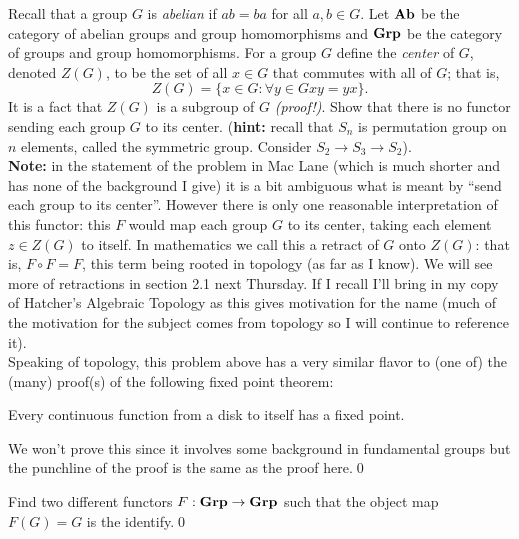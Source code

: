 \begin{problem} Recall that a group \(G\) is \textit{abelian} if \(ab = ba\) for
  all \(a,b \in G\). Let \(\mathbf{{Ab}}\) be the category of abelian groups and group
  homomorphisms and \(\mathbf{{Grp}}\) be the category of groups and group
  homomorphisms.
  For a group \(G\) define the \textit{center} of \(G\), denoted \(Z(G)\), to be
  the set of all \(x \in G\) that commutes with all of \(G\); that is,
  \[Z(G) = \{x \in G : \forall y \in G xy = yx\}.\]
  It is a fact that \(Z(G)\) is a subgroup of \(G\) \textit{(proof!)}.
  Show that there is no functor sending each group \(G\) to its center.
  (\textbf{hint:} recall that \(S_n\) is permutation group on \(n\) elements,
  called the symmetric group. Consider \(S_2 \to S_3 \to S_2\)).\\

  \textbf{Note:} in the statement of the problem in Mac Lane (which is much
  shorter and has none of the background I give) it is a bit ambiguous what is
  meant by ``send each group to its center''. However there is only one
  reasonable interpretation of this functor: this \(F\) would map each group
  \(G\) to its center, taking each element \(z \in Z(G)\) to itself. In
  mathematics we call this a retract of \(G\) onto \(Z(G)\): that is, \(F\circ F
  = F\), this term being rooted in topology (as far as I know). We will see more
  of retractions in section 2.1 next Thursday. If I recall I'll bring in my copy
  of Hatcher's Algebraic Topology as this gives motivation for the name (much of
  the motivation for the subject comes from topology so I will continue to
  reference it).\\

  Speaking of topology, this problem above has a very similar flavor to (one of)
  the (many) proof(s) of the following fixed point theorem: 
  \begin{theorem}[Brouwer]
    Every continuous function from a disk to itself has a fixed point.
  \end{theorem}
  We won't prove this since it involves some background in fundamental groups
  but the punchline of the proof is the same as the proof here.\qed{}

\end{problem}

\begin{problem}
  Find two different functors \(F: \mathbf{{Grp}} \to \mathbf{{Grp}}\) such that the object map
  \(F(G) = G\) is the identify.\qed{}
\end{problem}


